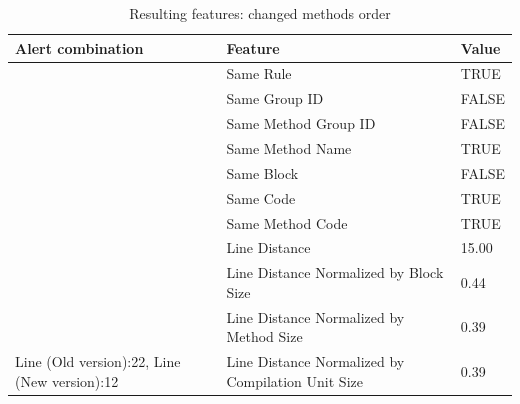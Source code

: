 \documentclass[
]{article}
\begin{document}
\begin{table}[!h]

\caption{\label{tab:unnamed-chunk-18}Resulting features: changed methods order \label{changing_method_order} }
\centering
\begin{tabular}[t]{l|l|l}
\hline
Alert combination & Feature & Value\\
\hline
\rowcolor{gray!6}   & Same Rule & TRUE\\

 & Same Group ID & FALSE\\

\rowcolor{gray!6}   & Same Method Group ID & FALSE\\

 & Same Method Name & TRUE\\

\rowcolor{gray!6}   & Same Block & FALSE\\

 & Same Code & TRUE\\

\rowcolor{gray!6}   & Same Method Code & TRUE\\

 & Line Distance & 15.00\\

\rowcolor{gray!6}   & Line Distance Normalized by Block Size & 0.44\\

 & Line Distance Normalized by Method Size & 0.39\\

\multirow[t]{-11}{*}{\raggedright\arraybackslash Line (Old version):22, Line (New version):12} & Line Distance Normalized by Compilation Unit Size & 0.39\\
\hline
\end{tabular}
\end{table}

\normalsize

\newpage
\end{document}
